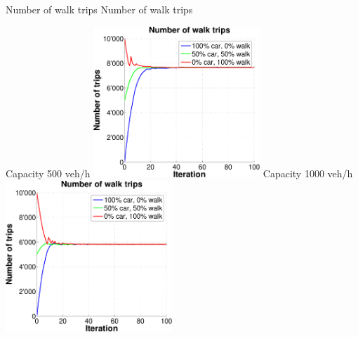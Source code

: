 {}

\createfigure%
{Number of walk trips}%
{Number of walk trips}%
{\label{fig:InitialModeAverageNumWalkTrips}}%
{%
  \createsubfigure%
  {Capacity 500 veh/h}%
  {\includegraphics[width=0.47\textwidth, angle=0, trim=0mm 0mm 0mm 9mm, clip=true]{extending/figures/MultiModalSimulation/simulations/num_walk_trips_500}}%
  {\label{}}%
  {\hspace{3mm}}%
  \createsubfigure%
  {Capacity 1000 veh/h}%
  {\includegraphics[width=0.47\textwidth, angle=0, trim=0mm 0mm 0mm 9mm, clip=true]{extending/figures/MultiModalSimulation/simulations/num_walk_trips_1000}}%
  {\label{}}%
  {\vspace{7.5mm}}%

}

